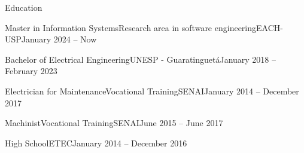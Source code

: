 \documentclass[]{template}
\begin{document}
\resumeheader
{}
{}
{}
{}
{}

\vspace*{1mm}

\begin{section}{Education}
 \begin{subsectionnobullet}{Master in Information Systems}{Research area in software engineering}{EACH-USP}{January 2024 -- Now}
     \item%
 \end{subsectionnobullet}
 
 \begin{subsectionnobullet}{Bachelor of Electrical Engineering}{­}{UNESP - Guaratinguetá}{January 2018 -- February 2023}
 \end{subsectionnobullet}
 
 \begin{subsectionnobullet}{Electrician for Maintenance}{Vocational Training}{SENAI}{January 2014 -- December 2017}
     \item%
 \end{subsectionnobullet}
 
 \begin{subsectionnobullet}{Machinist}{Vocational Training}{SENAI}{June 2015 -- June 2017}
     \item%
 \end{subsectionnobullet}
 
 \begin{subsectionnobullet}{High School}{­}{ETEC}{January 2014 -- December 2016}
     \item%
 \end{subsectionnobullet}
\end{section}
\end{document}
